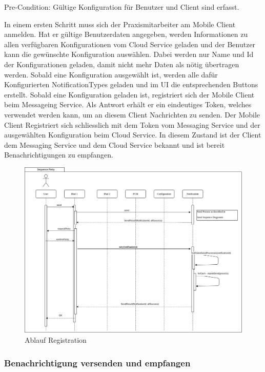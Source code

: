 Pre-Condition: Gültige Konfiguration für Benutzer und Client sind erfasst.

In einem ersten Schritt muss sich der Praxismitarbeiter am Mobile Client anmelden.
Hat er gültige Benutzerdaten angegeben, werden Informationen zu allen verfügbaren Konfigurationen vom Cloud Service geladen und der Benutzer kann die gewünschte Konfiguration auswählen.
Dabei werden nur Name und Id der Konfigurationen geladen, damit nicht mehr Daten als nötig übertragen werden.
Sobald eine Konfiguration ausgewählt ist, werden alle dafür Konfigurierten NotificationTypes geladen und im UI die entsprechenden Buttons erstellt.
Sobald eine Konfiguration geladen ist, registriert sich der Mobile Client beim Messageing Service.
Als Antwort erhält er ein eindeutiges Token, welches verwendet werden kann, um an diesem Client Nachrichten zu senden.
Der Mobile Client Registriert sich schliesslich mit dem Token vom Messaging Service und der ausgewählten Konfiguration beim Cloud Service.
In diesem Zustand ist der Client dem Messaging Service und dem Cloud Service bekannt und ist bereit Benachrichtigungen zu empfangen.

\begin{figure}[h]
    \centering
    \begin{minipage}[b]{1.0\textwidth}
        \includegraphics[width=\textwidth]{graphics/Sequence_Notification_Register}
        \caption{Ablauf Registration}
    \end{minipage}
\end{figure}


\subsubsection*{Benachrichtigung versenden und empfangen}

